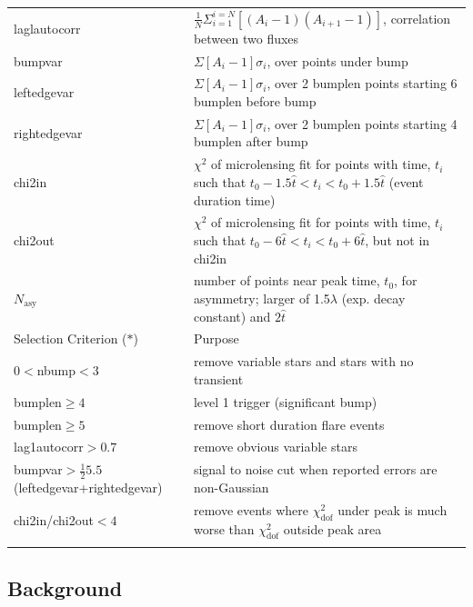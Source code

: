 \documentclass[iop, apj]{emulateapj}
\newcommand{\?}{\stackrel{?}{=}}
\begin{document}
\begin{table}[t]
\begin{center}
\begin{tabular}{ll}
laglautocorr & $\frac{1}{N}\Sigma^{i=N}_{i=1}[(A_i-1)(A_{i+1}-1)]$, correlation between two fluxes\\
bumpvar & $\Sigma [A_i-1]\sigma_i$, over points under bump\\
leftedgevar & $\Sigma [A_i-1]\sigma_i$, over 2 bumplen points starting 6 bumplen before bump\\
rightedgevar & $\Sigma [A_i-1]\sigma_i$, over 2 bumplen points starting 4 bumplen after bump\\
chi2in &  $\chi^2$ of microlensing fit for points with time, $t_i$ such that $t_0-1.5\hat t <t_i <t_0+1.5\hat t$ (event duration time)\\
chi2out &  $\chi^2$ of microlensing fit for points with time, $t_i$ such that $t_0-6\hat t <t_i <t_0+6\hat t$, but not in chi2in\\
$N_\mathrm{asy}$ & number of points near peak time, $t_0$, for asymmetry; larger of 1.5$\lambda$ (exp. decay constant) and $2\hat t$\\
 \hline 
 \hline 
   \multicolumn{1}{l}{Selection Criterion ($*$)}&\multicolumn{1}{l}{Purpose}\\
 \hline 
$0<$nbump$<3$ & remove variable stars and stars with no transient\\
bumplen$\geq 4$ & level 1 trigger (significant bump)\\
bumplen$\geq 5$ & remove short duration flare events\\
lag1autocorr$>0.7$ & remove obvious variable stars\\
bumpvar$>\frac{1}{2}5.5$ (leftedgevar+rightedgevar) & signal to noise cut when reported errors are non-Gaussian\\
chi2in/chi2out$<4$ & remove events where $\chi^2_\mathrm{dof}$ under peak is much worse than $\chi^2_\mathrm{dof}$ outside peak area\\
 \hline 
   \label{table:counta}
  	\end{tabular}
	   \end{center}
   \end{table}
%

\subsection{Background}
\end{document}
